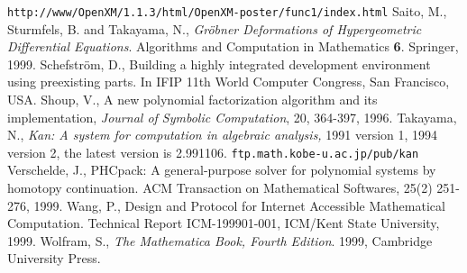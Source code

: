 \begin{thebibliography}{X}
{\footnotesize {\tt http://www/OpenXM/1.1.3/html/OpenXM-poster/func1/index.html}}
Saito, M., Sturmfels, B. and Takayama, N.,
{\it Gr\"obner Deformations of Hypergeometric Differential Equations}.
Algorithms and Computation in Mathematics {\bf 6}. Springer, 1999.
Schefstr\"om, D.,
Building a highly integrated development environment using
preexisting parts.
In IFIP 11th World Computer Congress, San Francisco, USA.
Shoup, V., 
A new polynomial factorization algorithm and 
its implementation,
{\sl Journal of Symbolic Computation}, 20, 364-397, 1996.
	Takayama, N.,
	{\em Kan: A system for computation in
	algebraic analysis,} 1991 version 1,
        1994 version 2, the latest version is 2.991106. 
	{\tt \small ftp.math.kobe-u.ac.jp/pub/kan}
Verschelde, J.,
PHCpack: A general-purpose solver for polynomial systems by
homotopy continuation.  ACM Transaction on Mathematical Softwares, 25(2) 
251-276, 1999.
Wang, P.,
Design and Protocol for Internet Accessible Mathematical Computation.
Technical Report ICM-199901-001, ICM/Kent State University, 1999.
Wolfram, S.,
{\it The Mathematica Book, Fourth Edition}.
1999, Cambridge University Press.
\end{thebibliography}
